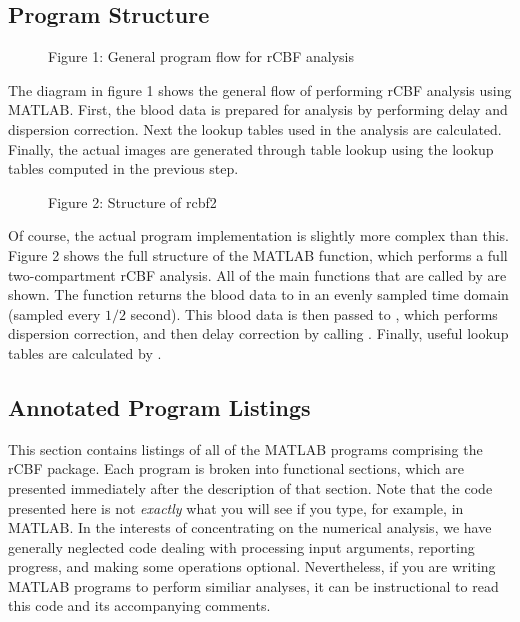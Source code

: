 \subsection{Program Structure}

\begin{figure}
\centerline{
}
\vspace{.25in}
\centerline{Figure 1: General program flow for rCBF analysis}
\end{figure}

The diagram in figure 1 shows the general flow of performing rCBF
analysis using MATLAB.  First, the blood data is prepared for
analysis by performing delay and dispersion correction.  Next the
lookup tables used in the analysis are calculated.  Finally, the
actual images are generated through table lookup using the lookup
tables computed in the previous step.

\begin{figure}
\centerline{
}
\vspace{.25in}
\centerline{Figure 2: Structure of rcbf2}
\end{figure}

Of course, the actual program implementation is slightly more complex
than this.  Figure 2 shows the full structure of the 
MATLAB function, which performs a full two-compartment rCBF analysis.
All of the main functions that are called by  are shown.
The  function returns the blood data to
 in an evenly sampled time domain (sampled every $1/2$
second).  This blood data is then passed to ,
which performs dispersion correction, and then delay correction by
calling .  Finally, useful lookup tables are
calculated by .

\subsection{Annotated Program Listings}

This section contains listings of all of the MATLAB programs
comprising the rCBF package.  Each program is broken into functional
sections, which are presented immediately after the description of
that section.  Note that the code presented here is not {\em exactly}
what you will see if you type, for example,  in
MATLAB.  In the interests of concentrating on the numerical analysis,
we have generally neglected code dealing with processing input
arguments, reporting progress, and making some operations optional.
Nevertheless, if you are writing MATLAB programs to perform similiar
analyses, it can be instructional to read this code and its
accompanying comments.

